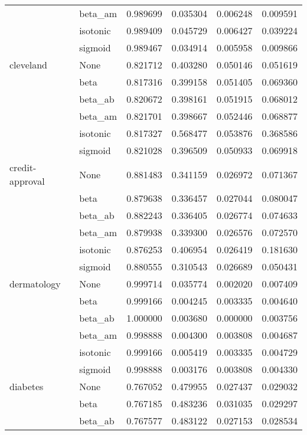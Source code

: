 \begin{tabular}{llrrrr}
        & beta\_am &  0.989699 &  0.035304 &  0.006248 &  0.009591 \\
        & isotonic &  0.989409 &  0.045729 &  0.006427 &  0.039224 \\
        & sigmoid &  0.989467 &  0.034914 &  0.005958 &  0.009866 \\
cleveland & None &  0.821712 &  0.403280 &  0.050146 &  0.051619 \\
        & beta &  0.817316 &  0.399158 &  0.051405 &  0.069360 \\
        & beta\_ab &  0.820672 &  0.398161 &  0.051915 &  0.068012 \\
        & beta\_am &  0.821701 &  0.398667 &  0.052446 &  0.068877 \\
        & isotonic &  0.817327 &  0.568477 &  0.053876 &  0.368586 \\
        & sigmoid &  0.821028 &  0.396509 &  0.050933 &  0.069918 \\
credit-approval & None &  0.881483 &  0.341159 &  0.026972 &  0.071367 \\
        & beta &  0.879638 &  0.336457 &  0.027044 &  0.080047 \\
        & beta\_ab &  0.882243 &  0.336405 &  0.026774 &  0.074633 \\
        & beta\_am &  0.879938 &  0.339300 &  0.026576 &  0.072570 \\
        & isotonic &  0.876253 &  0.406954 &  0.026419 &  0.181630 \\
        & sigmoid &  0.880555 &  0.310543 &  0.026689 &  0.050431 \\
dermatology & None &  0.999714 &  0.035774 &  0.002020 &  0.007409 \\
        & beta &  0.999166 &  0.004245 &  0.003335 &  0.004640 \\
        & beta\_ab &  1.000000 &  0.003680 &  0.000000 &  0.003756 \\
        & beta\_am &  0.998888 &  0.004300 &  0.003808 &  0.004687 \\
        & isotonic &  0.999166 &  0.005419 &  0.003335 &  0.004729 \\
        & sigmoid &  0.998888 &  0.003176 &  0.003808 &  0.004330 \\
diabetes & None &  0.767052 &  0.479955 &  0.027437 &  0.029032 \\
        & beta &  0.767185 &  0.483236 &  0.031035 &  0.029297 \\
        & beta\_ab &  0.767577 &  0.483122 &  0.027153 &  0.028534 \\

\end{tabular}
